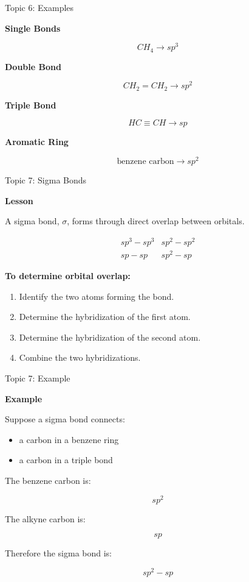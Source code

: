 \documentclass[aspectratio=169]{beamer}
\begin{document}
\begin{frame}[t]{Topic 6: Examples}
\small

\textbf{Single Bonds}

\[
CH_4 \rightarrow \boxed{sp^3}
\]

\textbf{Double Bond}

\[
CH_2=CH_2 \rightarrow \boxed{sp^2}
\]

\textbf{Triple Bond}

\[
HC\equiv CH \rightarrow \boxed{sp}
\]

\textbf{Aromatic Ring}

\[
\text{benzene carbon} \rightarrow \boxed{sp^2}
\]

\end{frame}

\begin{frame}[t]{Topic 7: Sigma Bonds}
\small

\textbf{Lesson}

A sigma bond, $\sigma$, forms through direct overlap between orbitals.

\[
\begin{array}{cc}
sp^3-sp^3 & sp^2-sp^2 \\[0.2cm]
sp-sp     & sp^2-sp
\end{array}
\]

\textbf{To determine orbital overlap:}

\begin{enumerate}
    \setlength{\itemsep}{0.06cm}
    \item Identify the two atoms forming the bond.
    \item Determine the hybridization of the first atom.
    \item Determine the hybridization of the second atom.
    \item Combine the two hybridizations.
\end{enumerate}

\end{frame}

\begin{frame}[t]{Topic 7: Example}
\small

\textbf{Example}

Suppose a sigma bond connects:

\begin{itemize}
    \setlength{\itemsep}{0.06cm}
    \item a carbon in a benzene ring
    \item a carbon in a triple bond
\end{itemize}

The benzene carbon is:

\[
\boxed{sp^2}
\]

The alkyne carbon is:

\[
\boxed{sp}
\]

Therefore the sigma bond is:

\[
\boxed{sp^2-sp}
\]

\end{frame}
\end{document}
